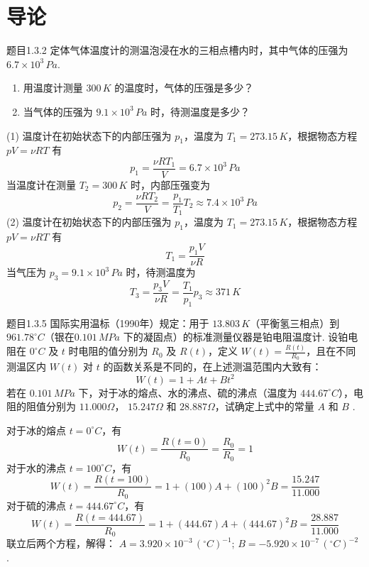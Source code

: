 \section{导论}

\begin{question}{题目1.3.2}
    定体气体温度计的测温泡浸在水的三相点槽内时，其中气体的压强为$6.7 \times 10^3\,\si{Pa}$.
    \begin{enumerate}
        \item[(1)] 用温度计测量 $300\,\si{K}$ 的温度时，气体的压强是多少？
        \item[(2)] 当气体的压强为 $9.1 \times 10^3\,\si{Pa}$ 时，待测温度是多少？
    \end{enumerate}
\end{question}

\begin{solution}
    (1) 温度计在初始状态下的内部压强为 $p_1$，温度为 $T_1 = 273.15\,\si{K}$，根据物态方程 $pV = \nu RT$ 有
    $$
        p_1 = \frac{\nu RT_1}{V} = 6.7 \times 10^3 \,\si{Pa}
    $$
    当温度计在测量 $T_2 = 300\,\si{K}$ 时，内部压强变为
    $$
        p_2 = \frac{\nu RT_2}{V}
        = \frac{p_1}{T_1}T_2
        \approx 7.4 \times 10^3 \,\si{Pa}
    $$
    (2) 温度计在初始状态下的内部压强为 $p_1$，温度为 $T_1 = 273.15\,\si{K}$，根据物态方程 $pV = \nu RT$ 有
    $$
        T_1 = \frac{p_1V}{\nu R}
    $$
    当气压为 $p_3 = 9.1 \times 10^3 \,\si{Pa}$ 时，待测温度为
    $$
        T_3 = \frac{p_3V}{\nu R}
        = \frac{T_1}{p_1}p_3
        \approx 371\,\si{K}
    $$
\end{solution}

\begin{question}{题目1.3.5}
    国际实用温标（1990年）规定：用于 $13.803 \,\si{K}$（平衡氢三相点）到 $961.78^\circ C$（银在$0.101 \,\si{MPa}$ 下的凝固点）的标准测量仪器是铂电阻温度计. 设铂电阻在 $0^\circ C$ 及 $t$ 时电阻的值分别为 $R_0$ 及 $R(t)$，定义 $W(t) = \frac{R(t)}{R_0}$，且在不同测温区内 $W(t)$ 对 $t$ 的函数关系是不同的，在上述测温范围内大致有：
    $$
        W(t) = 1 + At + Bt^2
    $$
    若在 $0.101\,\si{MPa}$ 下，对于冰的熔点、水的沸点、硫的沸点（温度为 $444.67^\circ C$），电阻的阻值分别为 $11.000\Omega$， $15.247\Omega$ 和 $28.887\Omega$，试确定上式中的常量 $A$ 和 $B$ .
\end{question}
\begin{solution}
    对于冰的熔点 $t = 0^\circ C$，有
    $$
        W(t) = \frac{R(t = 0)}{R_0} = \frac{R_0}{R_0} = 1
    $$
    对于水的沸点 $t = 100^\circ C$，有
    $$
        W(t) = \frac{R(t = 100)}{R_0} = 1+(100)A+(100)^2B = \frac{15.247}{11.000}
    $$
    对于硫的沸点 $t = 444.67^\circ C$，有
    $$
        W(t) = \frac{R(t = 444.67)}{R_0} = 1+(444.67)A+(444.67)^2B = \frac{28.887}{11.000}
    $$
    联立后两个方程，解得： $A = 3.920 \times 10^{-3} \,\si{(^\circ C)^{-1}}$; $B = -5.920 \times 10^{-7} \,\si{(^\circ C)^{-2}}$ .
\end{solution}

